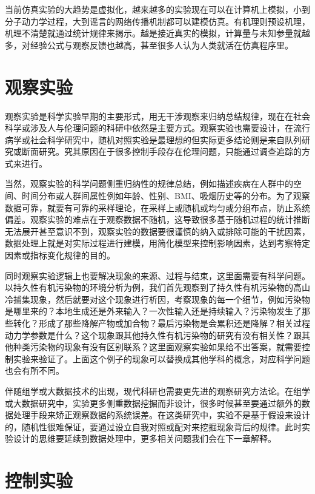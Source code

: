 \documentclass[]{tufte-book}
\begin{document}
当前仿真实验的大趋势是虚拟化，越来越多的实验现在可以在计算机上模拟，小到分子动力学过程，大到谣言的网络传播机制都可以建模仿真。有机理则预设机理，机理不清楚就通过统计规律来揭示。越是接近真实的模拟，计算量与未知参量就越多，对经验公式与观察反馈也越高，甚至很多人认为人类就活在仿真程序里。

\hypertarget{ux89c2ux5bdfux5b9eux9a8c}{%
\section{观察实验}\label{ux89c2ux5bdfux5b9eux9a8c}}

观察实验是科学实验早期的主要形式，用无干涉观察来归纳总结规律，现在在社会科学或涉及人与伦理问题的科研中依然是主要方式。观察实验也需要设计，在流行病学或社会科学研究中，随机对照实验是最理想的但实际更多结论则是来自队列研究或断面研究。究其原因在于很多控制手段存在伦理问题，只能通过调查追踪的方式来进行。

当然，观察实验的科学问题侧重归纳性的规律总结，例如描述疾病在人群中的空间、时间分布或人群间属性例如年龄、性别、BMI、吸烟历史等的分布。为了观察数据可靠，就要有可靠的采样理论，在采样上或随机或均匀或分组布点，防止系统偏差。观察实验的难点在于观察数据不随机，这导致很多基于随机过程的统计推断无法展开甚至意识不到，观察实验的数据要很谨慎的纳入或排除可能的干扰因素，数据处理上就是对实际过程进行建模，用简化模型来控制影响因素，达到考察特定因素或指标变化规律的目的。

同时观察实验逻辑上也要解决现象的来源、过程与结束，这里面需要有科学问题。以持久性有机污染物的环境分析为例，我们首先观察到了持久性有机污染物的高山冷捕集现象，然后就要对这个现象进行析因，考察现象的每一个细节，例如污染物是哪里来的？本地生成还是外来输入？一次性输入还是持续输入？污染物发生了那些转化？形成了那些降解产物或加合物？最后污染物是会累积还是降解？相关过程动力学参数是什么？这个现象跟其他持久性有机污染物的研究有没有相关性？跟其他种类污染物的现象有没有区别联系？这里面观察实验如果给不出答案，就需要控制实验来验证了。上面这个例子的现象可以替换成其他学科的概念，对应科学问题也会有所不同。

伴随组学或大数据技术的出现，现代科研也需要更先进的观察研究方法论。在组学或大数据研究中，实验更多侧重数据挖掘而非设计，很多时候甚至要通过额外的数据处理手段来矫正观察数据的系统误差。在这类研究中，实验不是基于假设来设计的，随机性很难保证，要通过设立自我对照或配对来挖掘现象背后的规律。此时实验设计的思维要延续到数据处理中，更多相关问题我们会在下一章解释。

\hypertarget{ux63a7ux5236ux5b9eux9a8c}{%
\section{控制实验}\label{ux63a7ux5236ux5b9eux9a8c}}
\end{document}
